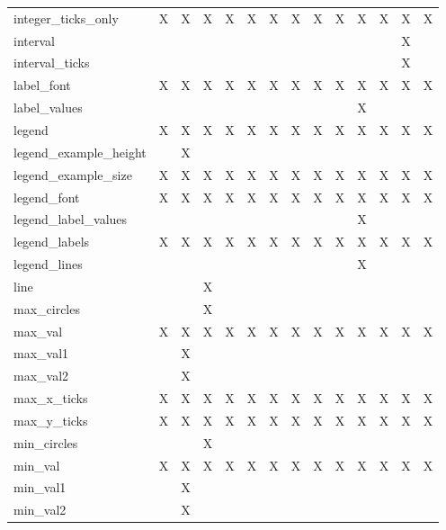 {\begin{table}
\begin{tabular}{|l|c|c|c|c|c|c|c|c|c|c|c|c|c|}
integer\_ticks\_only   & X & X & X & X & X & X & X & X & X & X & X & X & X \\
interval               &   &   &   &   &   &   &   &   &   &   &   & X &   \\
interval\_ticks        &   &   &   &   &   &   &   &   &   &   &   & X &   \\
label\_font            & X & X & X & X & X & X & X & X & X & X & X & X & X \\
label\_values          &   &   &   &   &   &   &   &   &   & X &   &   &   \\
legend                 & X & X & X & X & X & X & X & X & X & X & X & X & X \\
legend\_example\_height&   & X &   &   &   &   &   &   &   &   &   &   &   \\
legend\_example\_size  & X & X & X & X & X & X & X & X & X & X & X & X & X \\
legend\_font           & X & X & X & X & X & X & X & X & X & X & X & X & X \\
legend\_label\_values  &   &   &   &   &   &   &   &   &   & X &   &   &   \\
legend\_labels         & X & X & X & X & X & X & X & X & X & X & X & X & X \\
legend\_lines          &   &   &   &   &   &   &   &   &   & X &   &   &   \\
line                   &   &   & X &   &   &   &   &   &   &   &   &   &   \\
max\_circles           &   &   & X &   &   &   &   &   &   &   &   &   &   \\
max\_val               & X & X & X & X & X & X & X & X & X & X & X & X & X \\
max\_val1              &   & X &   &   &   &   &   &   &   &   &   &   &   \\
max\_val2              &   & X &   &   &   &   &   &   &   &   &   &   &   \\
max\_x\_ticks          & X & X & X & X & X & X & X & X & X & X & X & X & X \\
max\_y\_ticks          & X & X & X & X & X & X & X & X & X & X & X & X & X \\
min\_circles           &   &   & X &   &   &   &   &   &   &   &   &   &   \\
min\_val               & X & X & X & X & X & X & X & X & X & X & X & X & X \\
min\_val1              &   & X &   &   &   &   &   &   &   &   &   &   &   \\
min\_val2              &   & X &   &   &   &   &   &   &   &   &   &   &   \\

\end{tabular}
\end{table}}
